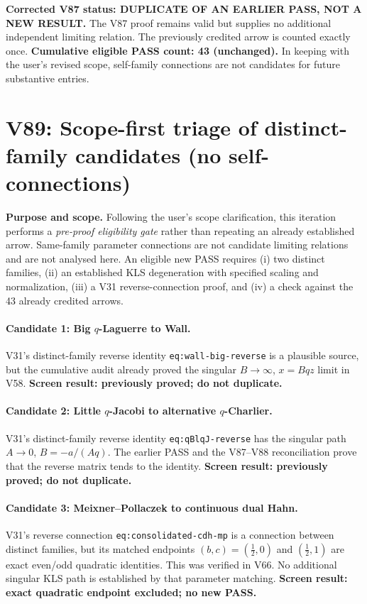 \documentclass[11pt]{article}
\begin{document}
\noindent\textbf{Corrected V87 status: DUPLICATE OF AN EARLIER PASS, NOT A NEW RESULT.} The V87 proof remains valid but supplies no additional independent limiting relation. The previously credited arrow is counted exactly once. \textbf{Cumulative eligible PASS count: 43 (unchanged).} In keeping with the user's revised scope, self-family connections are not candidates for future substantive entries.


\section{V89: Scope-first triage of distinct-family candidates (no self-connections)}
\noindent\textbf{Purpose and scope.} Following the user's scope clarification, this iteration performs a \emph{pre-proof eligibility gate} rather than repeating an already established arrow. Same-family parameter connections are not candidate limiting relations and are not analysed here. An eligible new PASS requires (i) two distinct families, (ii) an established KLS degeneration with specified scaling and normalization, (iii) a V31 reverse-connection proof, and (iv) a check against the 43 already credited arrows.

\paragraph{Candidate 1: Big $q$-Laguerre to Wall.}
V31's distinct-family reverse identity \texttt{eq:wall-big-reverse} is a plausible source, but the cumulative audit already proved the singular $B\to\infty$, $x=Bqz$ limit in V58. \textbf{Screen result: previously proved; do not duplicate.}

\paragraph{Candidate 2: Little $q$-Jacobi to alternative $q$-Charlier.}
V31's distinct-family reverse identity \texttt{eq:qBlqJ-reverse} has the singular path $A\to0$, $B=-a/(Aq)$. The earlier PASS and the V87--V88 reconciliation prove that the reverse matrix tends to the identity. \textbf{Screen result: previously proved; do not duplicate.}

\paragraph{Candidate 3: Meixner--Pollaczek to continuous dual Hahn.}
V31's reverse connection \texttt{eq:consolidated-cdh-mp} is a connection between distinct families, but its matched endpoints $(b,c)=(\tfrac12,0)$ and $(\tfrac12,1)$ are exact even/odd quadratic identities. This was verified in V66. No additional singular KLS path is established by that parameter matching. \textbf{Screen result: exact quadratic endpoint excluded; no new PASS.}
\end{document}
